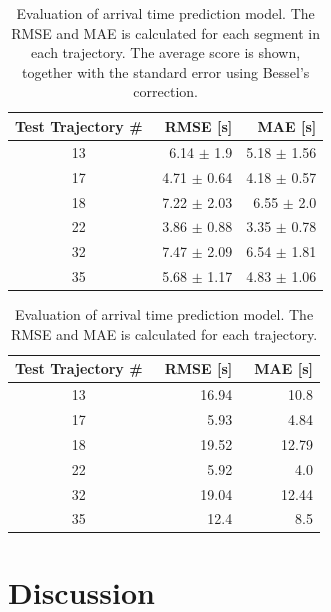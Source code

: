 \begin{table}[h!]
    \centering
    \caption[ Evaluation of arrival time prediction model ]%
    {{\small Evaluation of arrival time prediction model.
    The RMSE and MAE is calculated for each segment in each trajectory.
    The average score is shown, together with the standard error using Bessel's correction.}}
    \label{tab:arrival-time-eval-metrics} 
    \begin{tabular}{ |c|r|r| }
        \hline
        Test Trajectory \# & RMSE [s] & MAE [s] \\
        \hline
        13 & 6.14 $\pm$ 1.9 & 5.18 $\pm$ 1.56\\
        17 & 4.71 $\pm$ 0.64 & 4.18 $\pm$ 0.57 \\
        18 & 7.22 $\pm$ 2.03 & 6.55 $\pm$ 2.0 \\
        22 & 3.86 $\pm$ 0.88 & 3.35 $\pm$ 0.78 \\
        32 & 7.47 $\pm$ 2.09 & 6.54 $\pm$ 1.81 \\
        35 & 5.68 $\pm$ 1.17 & 4.83 $\pm$ 1.06 \\
        \hline
    \end{tabular}
\end{table}

\begin{table}[h!]
    \centering
    \caption[ Evaluation of arrival time prediction model ]%
    {{\small Evaluation of arrival time prediction model.
    The RMSE and MAE is calculated for each trajectory.}}
    \label{tab:arrival-time-metrics} 
    \begin{tabular}{ |c|r|r| }
        \hline
        Test Trajectory \# & RMSE [s] & MAE [s] \\
        \hline
        13 & 16.94 & 10.8 \\
        17 & 5.93 & 4.84 \\
        18 & 19.52 & 12.79 \\
        22 & 5.92 & 4.0 \\
        32 & 19.04 & 12.44 \\
        35 & 12.4 & 8.5 \\
        \hline
    \end{tabular}
\end{table}

\section{Discussion}

